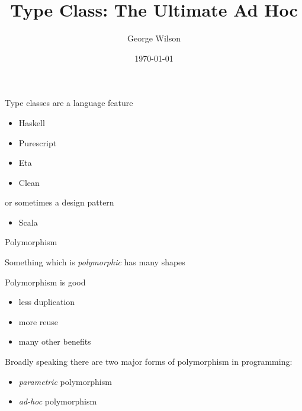 \documentclass[usenames,dvipsnames,svgnames,table,aspectratio=169,mathserif]{beamer}
\title[Type Class: The Ultimate Ad Hoc]{Type Class: The Ultimate Ad Hoc} %
\author{George Wilson} %
\institute[] %
{
Data61/CSIRO\\ %
\medskip
\href{george.wilson@data61.csiro.au}{george.wilson@data61.csiro.au} %
}
\date{\today} %
\begin{document}


\begin{frame}
\titlepage %
\end{frame}


\begin{frame}

Type classes are a language feature

\begin{itemize}
\item Haskell
\item Purescript
\item Eta
\item Clean
\end{itemize}

or sometimes a design pattern

\begin{itemize}
\item Scala
\end{itemize}

\end{frame}



\begin{frame}
\begin{center}
\huge{Polymorphism}
\end{center}
\end{frame}


\begin{frame}

Something which is {\it polymorphic} has many shapes

\end{frame}


\begin{frame}
\begin{center}
Polymorphism is good


\begin{itemize}
\item less duplication
\item more reuse
\item many other benefits
\end{itemize}
\end{center}
\end{frame}


\begin{frame}
Broadly speaking there are two major forms of polymorphism in programming:

\begin{itemize}
\item {\it parametric} polymorphism
\item {\it ad-hoc} polymorphism
\end{itemize}
\end{frame}
\end{document}
